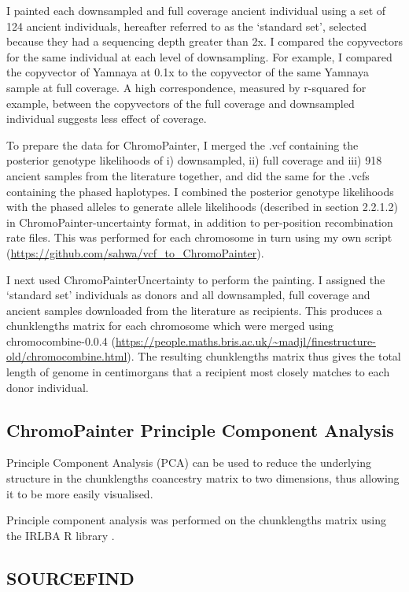 I painted each downsampled and full coverage ancient individual using a set of 124 ancient individuals, hereafter referred to as the `standard set', selected because they had a sequencing depth greater than 2x. I compared the copyvectors for the same individual at each level of downsampling. For example, I compared the copyvector of Yamnaya at 0.1x to the copyvector of the same Yamnaya sample at full coverage. A high correspondence, measured by r-squared for example, between the copyvectors of the full coverage and downsampled individual suggests less effect of coverage. 

To prepare the data for ChromoPainter, I merged the .vcf containing the posterior genotype likelihoods of i) downsampled, ii) full coverage and iii) 918 ancient samples from the literature together, and did the same for the .vcfs containing the phased haplotypes.  I combined the posterior genotype likelihoods with the phased alleles to generate allele likelihoods (described in section 2.2.1.2) in ChromoPainter-uncertainty format, in addition to per-position recombination rate files. This was performed for each chromosome in turn using my own script (\url{https://github.com/sahwa/vcf_to_ChromoPainter}).

I next used ChromoPainterUncertainty to perform the painting. I assigned the `standard set' individuals as donors and all downsampled, full coverage and ancient samples downloaded from the literature as recipients. This produces a chunklengths matrix for each chromosome which were merged using chromocombine-0.0.4 (\url{https://people.maths.bris.ac.uk/~madjl/finestructure-old/chromocombine.html}). The resulting chunklengths matrix thus gives the total length of genome in centimorgans that a recipient most closely matches to each donor individual. 

\subsection{ChromoPainter Principle Component Analysis}

Principle Component Analysis (PCA) can be used to reduce the underlying structure in the chunklengths coancestry matrix to two dimensions, thus allowing it to be more easily visualised. 

Principle component analysis was performed on the chunklengths matrix using the IRLBA R library \cite{baglama2005augmented}.


\subsection{SOURCEFIND}

